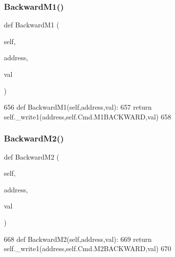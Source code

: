 \subsubsection{\texorpdfstring{Backward\+M1()}{BackwardM1()}}
{\footnotesize\ttfamily def Backward\+M1 (\begin{DoxyParamCaption}\item[{}]{self,  }\item[{}]{address,  }\item[{}]{val }\end{DoxyParamCaption})}


\begin{DoxyCode}
656     \textcolor{keyword}{def }BackwardM1(self,address,val):
657         \textcolor{keywordflow}{return} self.\_write1(address,self.Cmd.M1BACKWARD,val)
658 
\end{DoxyCode}
\mbox{\label{classtoxic__hardware_1_1roboclaw__3_1_1Roboclaw_a291d3a943191a562dd0c726430a45c9c}} 
\subsubsection{\texorpdfstring{Backward\+M2()}{BackwardM2()}}
{\footnotesize\ttfamily def Backward\+M2 (\begin{DoxyParamCaption}\item[{}]{self,  }\item[{}]{address,  }\item[{}]{val }\end{DoxyParamCaption})}


\begin{DoxyCode}
668     \textcolor{keyword}{def }BackwardM2(self,address,val):
669         \textcolor{keywordflow}{return} self.\_write1(address,self.Cmd.M2BACKWARD,val)
670 
\end{DoxyCode}
\mbox{\label{classtoxic__hardware_1_1roboclaw__3_1_1Roboclaw_a72ca8ef69781031cffede46595df8426}} 
